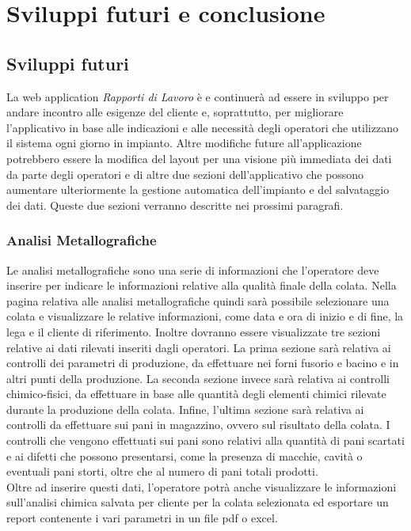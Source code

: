 \chapter{Sviluppi futuri e conclusione}
  \label{chapter_sviluppi_futuri_conclusione}
  \section{Sviluppi futuri}
  La web application \textit{Rapporti di Lavoro} è e continuerà ad essere in sviluppo per andare incontro alle esigenze
  del cliente e, soprattutto, per migliorare l'applicativo in base alle indicazioni e alle necessità degli operatori
  che utilizzano il sistema ogni giorno in impianto. Altre modifiche future all'applicazione potrebbero essere la modifica
  del layout per una visione più immediata dei dati da parte degli operatori e di altre due sezioni dell'applicativo che 
  possono aumentare ulteriormente la gestione automatica dell'impianto e del salvataggio dei dati. Queste due sezioni verranno
  descritte nei prossimi paragrafi. 

  \subsection{Analisi Metallografiche}
  Le analisi metallografiche sono una serie di informazioni che l'operatore deve inserire per indicare le informazioni
  relative alla qualità finale della colata. Nella pagina relativa alle analisi metallografiche quindi sarà possibile
  selezionare una colata e visualizzare le relative informazioni, come data e ora di inizio e di fine, la lega e il
  cliente di riferimento. Inoltre dovranno essere visualizzate tre sezioni relative ai dati rilevati inseriti dagli operatori.
  La prima sezione sarà relativa ai controlli dei parametri di produzione, da effettuare nei forni fusorio e bacino e in
  altri punti della produzione. La seconda sezione invece sarà relativa ai controlli chimico-fisici, da effettuare in base
  alle quantità degli elementi chimici rilevate durante la produzione della colata. Infine, l'ultima sezione sarà relativa
  ai controlli da effettuare sui pani in magazzino, ovvero sul risultato della colata. I controlli che vengono effettuati sui pani
  sono relativi alla quantità di pani scartati e ai difetti che possono presentarsi, come la presenza di macchie, cavità o
  eventuali pani storti, oltre che al numero di pani totali prodotti.\\
  Oltre ad inserire questi dati, l'operatore potrà anche visualizzare le informazioni sull'analisi chimica salvata per cliente
  per la colata selezionata ed esportare un report contenente i vari parametri in un file pdf o excel.  

